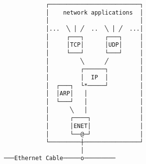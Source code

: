 \documentclass[varwidth,crop]{standalone}
\begin{document}
\begin{verbatim}
            ┌──────────────────────────┐
            │    network applications  │
            │                          │
            │...  ╲ │ ╱  ..  ╲ │ ╱  ...│
            │     ┌───┐      ┌───┐     │
            │     │TCP│      │UDP│     │
            │     └───┘      └───┘     │
            │         ╲      ╱         │
            │         ┌──────┐         │
            │         │  IP  │         │
            │  ┌───┐  └*─────┘         │
            │  │ARP│   │               │
            │  └───┘   │               │
            │      ╲   │               │
            │      ┌────┐              │
            │      │ENET│              │
            │      └──@─┘              │
            └─────────┼────────────────┘
                      │
───Ethernet Cable─────o─────────
\end{verbatim}
\end{document}
